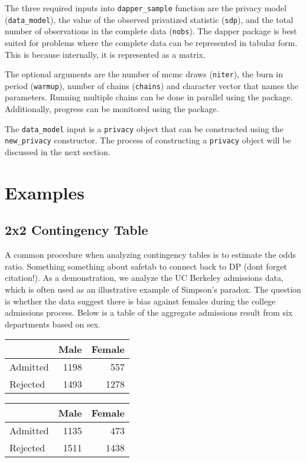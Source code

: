 The three required inputs into \texttt{dapper\_sample} function are the privacy model (\texttt{data\_model}), the value
of the observed privatized statistic (\texttt{sdp}), and the total number of observations
in the complete data (\texttt{nobs}). The dapper
package is best suited for problems where the complete data can be represented in
tabular form. This is because internally, it is represented as a matrix.

The optional arguments are the number of mcmc draws (\texttt{niter}), the
burn in period (\texttt{warmup}), number of chains (\texttt{chains}) and character
vector that names the parameters. Running multiple chains can be done in parallel
using the  package. Additionally, progress can be monitored
using the  package.

The \texttt{data\_model} input is a \texttt{privacy}
object that can be constructed using the \texttt{new\_privacy} constructor. The
process of constructing a \texttt{privacy} object will be discussed in the next section.

\hypertarget{examples}{%
\section{Examples}\label{examples}}

\hypertarget{x2-contingency-table}{%
\subsection{2x2 Contingency Table}\label{x2-contingency-table}}

A common procedure when analyzing contingency tables is to estimate the
odds ratio. Something something about safetab to connect back to DP (dont forget citation!).
As a demonstration, we analyze the UC Berkeley admissions data, which is often
used as an illustrative example of Simpson's paradox. The question is whether
the data suggest there is bias against females during the college admissions
process. Below is a table of the aggregate admissions result from six departments based on sex.

\begin{table}[!h]

\centering
\begin{tabular}[t]{lrr}
\toprule
  & Male & Female\\
\midrule
Admitted & 1198 & 557\\
Rejected & 1493 & 1278\\
\bottomrule
\end{tabular}
\centering
\begin{tabular}[t]{lrr}
\toprule
  & Male & Female\\
\midrule
Admitted & 1135 & 473\\
Rejected & 1511 & 1438\\
\bottomrule
\end{tabular}
\end{table}

